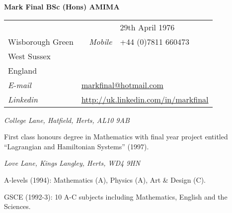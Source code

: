 \documentclass[a4paper,12pt]{article}
\newcommand{\me}{Mark Final BSc (Hons) AMIMA}
\newcommand{\largeme}{{\Large\bf\me}}
\newcommand{\cvheading}[1]{{\medskip\noindent\hspace{-5mm}{\sc #1}\par}}
\newcommand{\place}[2]{\vspace*{1ex}{\noindent\bf #1}\hfill{\it #2}\par}
\begin{document}
\largeme

\begin{tabular}{lrl}
& \hspace*{30mm}{\it Birth Date} & 29th April 1976\\
Wisborough Green & {\it Mobile} & +44 (0)7811 660473\\
West Sussex &&\\
England &&\\
{\it E-mail} & \multicolumn{2}{l}{\href{mailto:markfinal@hotmail.com}{markfinal@hotmail.com}}\\
{\it Linkedin} & \multicolumn{2}{l}{\href{http://uk.linkedin.com/in/markfinal}{http://uk.linkedin.com/in/markfinal}}\\
\end{tabular}


\cvheading{Education}
\place{University of Hertfordshire}{College Lane, Hatfield, Herts, AL10 9AB}
First class honours degree in Mathematics with final year project entitled ``Lagrangian and Hamiltonian Systems'' (1997).

\place{Kings Langley Secondary School}{Love Lane, Kings Langley, Herts, WD4 9HN}
A-levels (1994): Mathematics (A), Physics (A), Art \& Design (C).

GSCE (1992-3): 10 A-C subjects including Mathematics, English and the Sciences.
\end{document}
